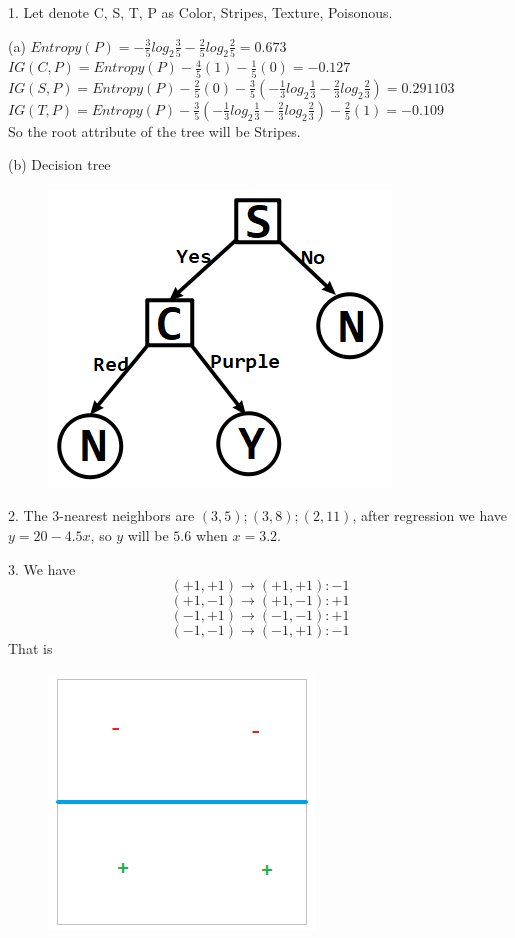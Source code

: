 \documentclass{article}
\begin{document}
\maketitle
\begin{tlist}{3}
	\item[1.]
	Let denote C, S, T, P as Color, Stripes, Texture, Poisonous.
	\begin{tlist}{4}
		\item[(a)]
		$Entropy(P)=-\frac{3}{5}log_2\frac{3}{5}-\frac{2}{5}log_2\frac{2}{5}=0.673$\\
		$IG(C,P)=Entropy(P)-\frac{4}{5}(1)-\frac{1}{5}(0)=-0.127$\\
		$IG(S,P)=Entropy(P)-\frac{2}{5}(0)-\frac{3}{5}(-\frac{1}{3}log_2\frac{1}{3}-\frac{2}{3}log_2\frac{2}{3})=0.291103$\\
		$IG(T,P)=Entropy(P)-\frac{3}{5}(-\frac{1}{3}log_2\frac{1}{3}-\frac{2}{3}log_2\frac{2}{3})-\frac{2}{5}(1)=-0.109$\\
		So the root attribute of the tree will be Stripes.
		\item[(b)]
		Decision tree
		\begin{figure}[H]\centering\includegraphics{1-b.png}\end{figure}
	\end{tlist}
	\item[2.]
	The 3-nearest neighbors are $(3,5);(3,8);(2,11)$, after regression we have $y=20-4.5x$, so $y$ will be $5.6$ when $x=3.2$.
	\item[3.]
	We have $$(+1,+1)\to(+1,+1):-1$$ $$(+1,-1)\to(+1,-1):+1$$ $$(-1,+1)\to(-1,-1):+1$$ $$(-1,-1)\to(-1,+1):-1$$
	That is
	\begin{figure}[H]\centering\includegraphics{3.png}\end{figure}

\end{tlist}
\end{document}
